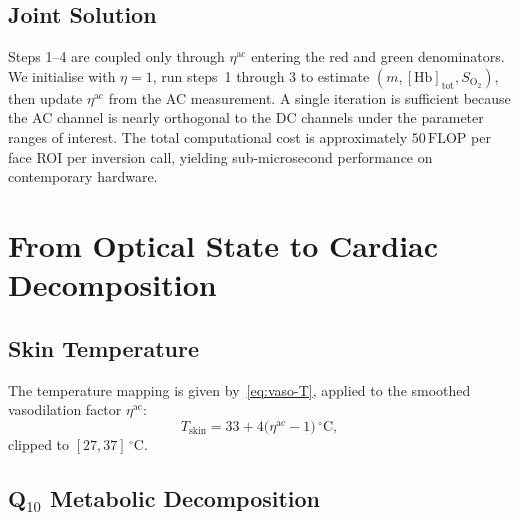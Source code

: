 \documentclass[10pt,twocolumn,a4paper]{article}
\theoremstyle{definition}
\newcommand{\Hb}{\mathrm{Hb}}
\newcommand{\Tskin}{T_{\mathrm{skin}}}
\newcommand{\vaso}{\eta}
\newcommand{\melan}{m}
\newcommand{\Hbconc}{[\Hb]_{\mathrm{tot}}}
\newcommand{\Soxy}{S_{\mathrm{O_2}}}
\begin{document}
\subsection{Joint Solution}

Steps 1--4 are coupled only through $\vaso^{\mathrm{ac}}$ entering the
red and green denominators. We initialise with $\vaso=1$, run steps~1
through 3 to estimate $(\melan,\Hbconc,\Soxy)$, then update
$\vaso^{\mathrm{ac}}$ from the AC measurement. A single iteration is
sufficient because the AC channel is nearly orthogonal to the DC
channels under the parameter ranges of interest. The total
computational cost is approximately $50\,\mathrm{FLOP}$ per face
ROI per inversion call, yielding sub-microsecond performance on
contemporary hardware.

\section{From Optical State to Cardiac Decomposition}\label{sec:cardiac}

\subsection{Skin Temperature}

The temperature mapping is given by~\cref{eq:vaso-T}, applied to the
smoothed vasodilation factor $\vaso^{\mathrm{ac}}$:
\begin{equation}
    \Tskin = 33 + 4\bigl(\vaso^{\mathrm{ac}} - 1\bigr)\,^{\circ}\mathrm{C},
\end{equation}
clipped to $[27, 37]\,^{\circ}\mathrm{C}$.

\subsection{Q$_{10}$ Metabolic Decomposition}
\end{document}
